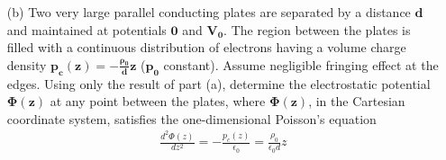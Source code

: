 \documentclass{article}
\begin{document}
{\begin{enumerate}
		\item[(b)] Two very large parallel conducting plates are separated by a distance $\bm{d}$ and maintained at potentials $\bm{0}$ and $\bm{V_0}$. The region between the plates is filled with a continuous distribution of electrons having a volume charge density $\bm{p_c (z) = -\frac{\rho_0}{d}z}$ ($\bm{p_0}$ constant). Assume negligible fringing effect at the edges. Using only the result of part (a), determine the electrostatic potential $\bm{\Phi (z)}$ at any point between the plates, where $\bm{\Phi (z)}$, in the Cartesian coordinate system, satisfies the one-dimensional Poisson's equation
		\begin{equation*}
			\begin{split}
				\frac{d^2 \Phi(z)}{dz^2} = -\frac{p_c (z)}{\epsilon_0} = \frac{\rho_0}{\epsilon_0 d}z
			\end{split}
		\end{equation*}

\end{enumerate}}
\end{document}
